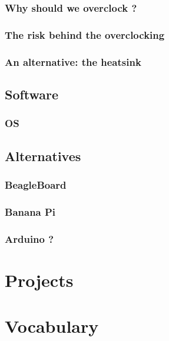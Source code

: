 \documentclass[10pt,a4paper]{article}
\begin{document}
\subsubsection{Why should we overclock ?}

\subsubsection{The risk behind the overclocking}

\subsubsection{An alternative: the heatsink}

\subsection{Software}

\subsubsection{OS}

\subsection{Alternatives}

\subsubsection{BeagleBoard}

\subsubsection{Banana Pi}

\subsubsection{Arduino ?}

\section{Projects}

\newpage

\section{Vocabulary}
\end{document}
